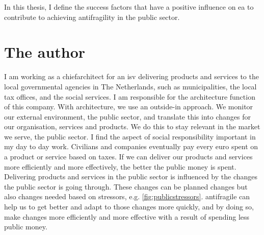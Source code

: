 In this thesis, I define the success factors that have a positive influence on \acrfull{ea} to contribute to achieving \gls{antifragility} in the public sector.
\section{The author}
\label{sec:context}
I am working as a \gls{chiefarchitect} for an \acrfull{isv} delivering products and services to the local governmental agencies in The Netherlands, such as municipalities, the local tax offices, and the social services. I am responsible for the architecture function of this company. With architecture, we use an outside-in approach. We monitor our external environment, the public sector, and translate this into changes for our organisation, services and products. We do this to stay relevant in the market we serve, the public sector. I find the aspect of social responsibility important in my day to day work. Civilians and companies eventually pay every euro spent on a product or service based on taxes. If we can deliver our products and services more efficiently and more effectively, the better the public money is spent. Delivering products and services in the public sector is influenced by the changes the public sector is going through. These changes can be planned changes but also changes needed based on \glspl{stressor}, e.g. \cref{fig:publicstressors}. \Gls{antifragile} can help us to get better and adapt to those changes more quickly, and by doing so, make changes more efficiently and more effective with a result of spending less public money.
